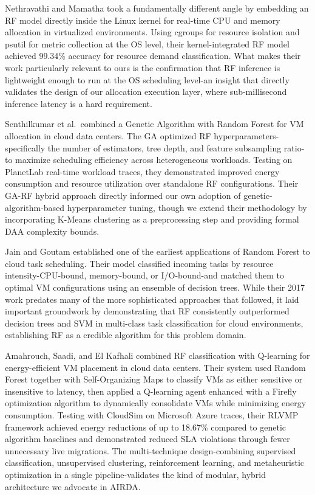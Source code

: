 \documentclass[conference]{IEEEtran}
\begin{document}
Nethravathi and Mamatha took a fundamentally different angle by embedding an RF model directly inside the Linux kernel for real-time CPU and memory allocation in virtualized environments. Using cgroups for resource isolation and psutil for metric collection at the OS level, their kernel-integrated RF model achieved 99.34\% accuracy for resource demand classification. What makes their work particularly relevant to ours is the confirmation that RF inference is lightweight enough to run at the OS scheduling level-an insight that directly validates the design of our allocation execution layer, where sub-millisecond inference latency is a hard requirement.~\cite{Ref2}

Senthilkumar et al.\ combined a Genetic Algorithm with Random Forest for VM allocation in cloud data centers. The GA optimized RF hyperparameters-specifically the number of estimators, tree depth, and feature subsampling ratio-to maximize scheduling efficiency across heterogeneous workloads. Testing on PlanetLab real-time workload traces, they demonstrated improved energy consumption and resource utilization over standalone RF configurations. Their GA-RF hybrid approach directly informed our own adoption of genetic-algorithm-based hyperparameter tuning, though we extend their methodology by incorporating K-Means clustering as a preprocessing step and providing formal DAA complexity bounds.~\cite{Ref3}

Jain and Goutam established one of the earliest applications of Random Forest to cloud task scheduling. Their model classified incoming tasks by resource intensity-CPU-bound, memory-bound, or I/O-bound-and matched them to optimal VM configurations using an ensemble of decision trees. While their 2017 work predates many of the more sophisticated approaches that followed, it laid important groundwork by demonstrating that RF consistently outperformed decision trees and SVM in multi-class task classification for cloud environments, establishing RF as a credible algorithm for this problem domain.~\cite{Ref4}

Amahrouch, Saadi, and El Kafhali combined RF classification with Q-learning for energy-efficient VM placement in cloud data centers. Their system used Random Forest together with Self-Organizing Maps to classify VMs as either sensitive or insensitive to latency, then applied a Q-learning agent enhanced with a Firefly optimization algorithm to dynamically consolidate VMs while minimizing energy consumption. Testing with CloudSim on Microsoft Azure traces, their RLVMP framework achieved energy reductions of up to 18.67\% compared to genetic algorithm baselines and demonstrated reduced SLA violations through fewer unnecessary live migrations. The multi-technique design-combining supervised classification, unsupervised clustering, reinforcement learning, and metaheuristic optimization in a single pipeline-validates the kind of modular, hybrid architecture we advocate in AIRDA.~\cite{Ref5}
\end{document}
